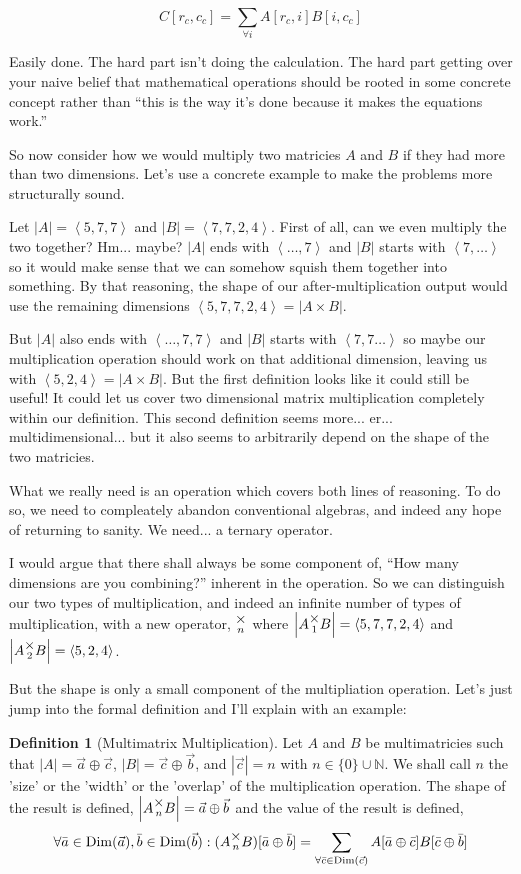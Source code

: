 \documentclass[12pt]{book}
\theoremstyle{plain}
\theoremstyle{definition}
\newtheorem{definition}{Definition}[chapter]
\theoremstyle{ppart}
\theoremstyle{case}
\theoremstyle{solution}
\DeclareMathOperator{\Dim}{Dim}
\newcommand{\mmult}[1]{\text{\raisebox{1ex}{$\underset{#1}{\times}$}}}
\newcommand{\shape}[1]{\left|#1\right|}
\begin{document}
\[ C[r_c, c_c] = \sum_{\forall i} A[r_c, i] B[i, c_c] \]

Easily done. The hard part isn't doing the calculation. The hard part getting over
your naive belief that mathematical operations should be rooted in some concrete
concept rather than ``this is the way it's done because it makes the equations
work.''

So now consider how we would multiply two matricies $A$ and $B$ if they had more
than two dimensions. Let's use a concrete example to make the problems more
structurally sound.

Let $\shape{A} = \left<5,7,7\right>$ and $\shape{B} = \left<7,7,2,4\right>$.
First of all, can we even multiply the two together? Hm... maybe? $\shape{A}$ ends with
$\left<\ldots, 7\right>$ and $\shape{B}$ starts with $\left<7,\ldots\right>$ so it would
make sense that we can somehow squish them together into something. By that reasoning,
the shape of our after-multiplication output would use the remaining dimensions
$\left<5, 7, 7, 2, 4\right> = \shape{A \times B}$.

But $\shape{A}$ also ends with $\left<\ldots, 7, 7\right>$ and $\shape{B}$ starts with
$\left<7, 7\ldots\right>$ so maybe our multiplication operation should work on that
additional dimension, leaving us with $\left<5, 2, 4\right> = \shape{A \times B}$.
But the first definition looks like it could still be useful! It could let us cover 
two dimensional matrix multiplication completely within our definition. This second
definition seems more... er... multidimensional... but it also seems to
arbitrarily depend on the shape of the two matricies.

What we really need is an operation which covers both lines of reasoning. To do
so, we need to compleately abandon conventional algebras, and indeed any hope of
returning to sanity. We need... a ternary operator.

I would argue that there shall always be some component of, 
``How many dimensions are you combining?'' inherent
in the operation. So we can distinguish our two types of multiplication, and indeed
an infinite number of types of multiplication, with a new operator, $\mmult{n}$ where
$\shape{A \mmult{1} B} = \left<5, 7, 7, 2, 4\right>$ and 
$\shape{A \mmult{2} B} = \left<5, 2, 4\right>$.

But the shape is only a small component of the multipliation  operation. Let's
just jump into the formal definition and I'll explain with an example:

\begin{definition}[Multimatrix Multiplication]
\label{mm_mult}
Let $A$ and $B$ be multimatricies such that $\shape{A} = \vec{a} \oplus \vec{c}$,
$\shape{B} = \vec{c} \oplus \vec{b}$, and $\shape{\vec{c}} = n$ with
$n \in \{0\} \cup \mathbb{N}$. We shall call $n$ the 'size' or the 'width'
or the 'overlap' of the multiplication operation.
The shape of the result is defined, $\shape{A \mmult{n} B} = \vec{a} \oplus \vec{b}$
and the value of the result is defined,
\[
\forall \bar{a} \in \Dim(\vec{a}), \bar{b} \in \Dim(\vec{b}):
(A \mmult{n}  B)[\bar{a} \oplus \bar{b}] =
\sum_{\forall \bar{c} \in \Dim(\vec{c})}
  A[\bar{a} \oplus \bar{c}] B[\bar{c} \oplus \bar{b}]
\]
\end{definition}
\end{document}
